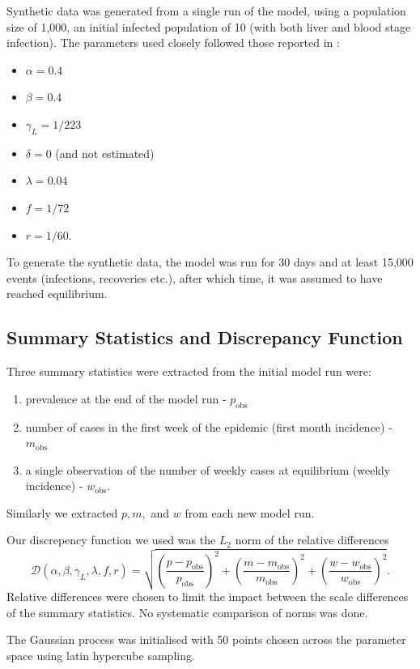 Synthetic data was generated from a single run of the model, using a population
size of 1,000, an initial infected population of 10 (with both liver and blood
stage infection). The parameters used closely followed those reported in
\cite{champagne_using_2022}: \begin{itemize}
    \item $\alpha = 0.4$
    \item $\beta = 0.4$
    \item $\gamma_L = 1 / 223$
    \item $\delta = 0$ (and not estimated)
    \item $\lambda = 0.04$
    \item $f = 1 / 72 $
    \item $r = 1 / 60.$
\end{itemize}
To generate the synthetic data, the model was run for 30 days and at least 15,000 events
(infections, recoveries etc.), after which time, it was assumed to have reached
equilibrium.

\subsection*{Summary Statistics and Discrepancy Function}

Three summary statistics were extracted from the initial model run were:
\begin{enumerate}
    \item prevalence at the end of the model run - $p_\text{obs}$
    \item number of cases in the first week of the epidemic
          (first month incidence) - $m_\text{obs}$
    \item a single observation of the number of weekly cases at equilibrium
          (weekly incidence) - $w_\text{obs}.$
\end{enumerate} Similarly we extracted $p, m,$ and $w$ from each new model run.

Our discrepency function we used was the $L_2$ norm of the relative differences
$$
    \mathcal{D}(\alpha, \beta, \gamma_L, \lambda, f, r) = \sqrt{
        \left(\frac{p - p_\text{obs}}{p_\text{obs}}\right)^2
        + \left(\frac{m - m_\text{obs}}{m_\text{obs}}\right)^2
        + \left(\frac{w - w_\text{obs}}{w_\text{obs}}\right)^2
    }.
$$ Relative differences were chosen to limit the impact between the scale differences of the summary statistics. No systematic comparison of norms was done.

The Gaussian process was initialised with 50 points chosen across the parameter space using latin hypercube sampling.

